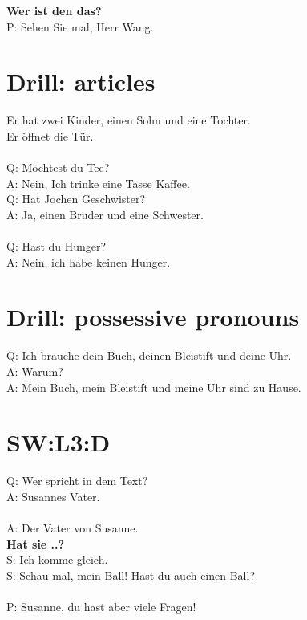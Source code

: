 \textbf{Wer ist den das?} \\
P: Sehen Sie mal, Herr Wang.  \\

\section{Drill: articles}
Er hat zwei Kinder, einen Sohn und eine Tochter.  \\
Er öffnet die Tür.  \\
\\
Q: Möchtest du Tee?  \\
A: Nein, Ich trinke eine Tasse Kaffee.  \\
Q: Hat Jochen Geschwister? \\
A: Ja, einen Bruder und eine Schwester.  \\
\\
Q: Hast du Hunger? \\
A: Nein, ich habe keinen Hunger.  \\

\section{Drill: possessive pronouns}
Q: Ich brauche dein Buch, deinen Bleistift und deine Uhr. \\
A: Warum? \\
A: Mein Buch, mein Bleistift und meine Uhr sind zu Hause.  \\

\section{SW:L3:D}
Q: Wer spricht in dem Text? \\
A: Susannes Vater.  \\
\\
A: Der Vater von Susanne. \\

\textbf{Hat sie ..?} \\
S: Ich komme gleich. \\
S: Schau mal, mein Ball! Hast du auch einen Ball?  \\
\\
P: Susanne, du hast aber viele Fragen!  \\

